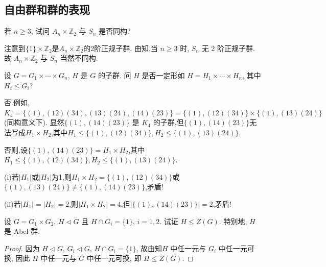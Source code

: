 \documentclass[../../main.tex]{subfiles}%
\begin{document}
\subsection{自由群和群的表现}

\begin{example}
若 $n \geqslant 3$, 试问 $A_n \times \mathbb{Z}_2$ 与 $S_n$ 是否同构?
\end{example}
\begin{solution}
注意到$\{1\}\times \mathbb{Z}_2$是$A_n \times \mathbb{Z}_2$的2阶正规子群.
由知,当 $n \geqslant 3$ 时, $S_n$ 无 2 阶正规子群. 故 $A_n \times \mathbb{Z}_2$ 与 $S_n$ 当然不同构.

\end{solution}

\begin{example}
设 $G = G_1 \times \cdots \times G_n$, $H$ 是 $G$ 的子群. 问 $H$ 是否一定形如 $H = H_1 \times \cdots \times H_n$, 其中 $H_i \leqslant G_i$?
\end{example}
\begin{solution}
否.例如, $K_4 = \{(1),(12)(34),(13)(24),(14)(23)\} = \{(1),(12)(34)\} \times \{(1),(13)(24)\}$(同构意义下). 显然$\{(1),(14)(23)\}$ 是 $K_4$ 的子群,但$\{(1),(14)(23)\}$无法写成$H_1\times H_2$,其中$H_1\leqslant \{(1),(12)(34)\},H_2\leqslant \{(1),(13)(24)\}$.

否则,设$\{(1),(14)(23)\}=H_1\times H_2$,其中$H_1\leqslant \{(1),(12)(34)\},H_2\leqslant \{(1),(13)(24)\}$.

(i)若$|H_1|$或$|H_2|$为1,则$H_1\times H_2 = \{(1),(12)(34)\}$或$\{(1),(13)(24)\}\neq \{(1),(14)(23)\}$,矛盾!

(ii)若$|H_1|=|H_2|=2$,则$|H_1\times H_2|=4$,但$|\{(1),(14)(23)\}|=2$,矛盾!

\end{solution}

\begin{example}
设 $G = G_1 \times G_2$, $H \lhd G$ 且 $H \cap G_i = \{1\}$, $i=1,2$. 试证 $H \leqslant Z(G)$. 特别地, $H$ 是 Abel 群.
\end{example}
\begin{proof}
因为 $H \lhd G$, $G_i \lhd G$, $H \cap G_i = \{1\}$, 故由知$H$ 中任一元与 $G_i$ 中任一元可换, 因此 $H$ 中任一元与 $G$ 中任一元可换, 即 $H \leqslant Z(G)$.
\end{proof}
\end{document}
